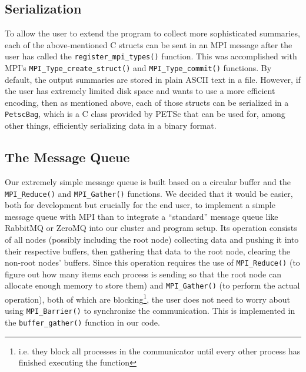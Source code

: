 \subsection*{Serialization}
To allow the user to extend the program to collect more sophisticated summaries, each of the above-mentioned C structs can be sent in an MPI message after the user has called the \lstinline{register_mpi_types()} function. This was accomplished with MPI's \lstinline{MPI_Type_create_struct()} and \lstinline{MPI_Type_commit()} functions. By default, the output summaries are stored in plain ASCII text in a file. However, if the user has extremely limited disk space and wants to use a more efficient encoding, then as mentioned above, each of those structs can be serialized in a \lstinline{PetscBag}, which is a C class provided by PETSc that can be used for, among other things, efficiently serializing data in a binary format.
\subsection*{The Message Queue}
Our extremely simple message queue is built based on a circular buffer and the \lstinline{MPI_Reduce()} and \lstinline{MPI_Gather()} functions. We decided that it would be easier, both for development but crucially for the end user, to implement a simple message queue with MPI than to integrate a ``standard'' message queue like RabbitMQ or ZeroMQ into our cluster and program setup. Its operation consists of all nodes (possibly including the root node) collecting data and pushing it into their respective buffers, then gathering that data to the root node, clearing the non-root nodes' buffers. Since this operation requires the use of \lstinline{MPI_Reduce()} (to figure out how many items each process is sending so that the root node can allocate enough memory to store them) and \lstinline{MPI_Gather()} (to perform the actual operation), both of which are blocking\footnote{i.e. they block all processes in the communicator until every other process has finished executing the function}, the user does not need to worry about using \lstinline{MPI_Barrier()} to synchronize the communication. This is implemented in the \lstinline{buffer_gather()} function in our code.

